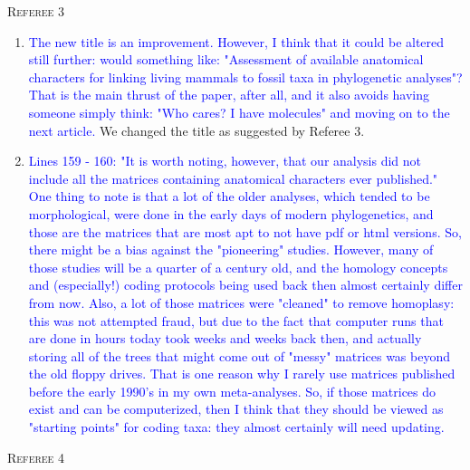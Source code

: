 \documentclass[12pt,letterpaper]{article}
\renewcommand{\section}[1]{%
\bigskip
\begin{center}
\begin{Large}
\normalfont\scshape #1
\medskip
\end{Large}
\end{center}}
\begin{document}
\section{Referee 3}

\begin{enumerate}
\item{\textcolor{blue}{The new title is an improvement.  However, I think that it could be altered still further: would something like: "Assessment of available anatomical characters for linking living mammals to fossil taxa in phylogenetic analyses"?  That is the main thrust of the paper, after all, and it also avoids having someone simply think: "Who cares? I have molecules" and moving on to the next article.}}
We changed the title as suggested by Referee 3.

\item{\textcolor{blue}{Lines 159 - 160: "It is worth noting, however, that our analysis did not include all the matrices containing anatomical characters ever published."
One thing to note is that a lot of the older analyses, which tended to be morphological, were done in the early days of modern phylogenetics, and those are the matrices that are most apt to not have pdf or html versions.  So, there might be a bias against the "pioneering" studies.  However, many of those studies will be a quarter of a century old, and the homology concepts and (especially!) coding protocols being used back then almost certainly differ from now.  Also, a lot of those matrices were "cleaned" to remove homoplasy: this was not attempted fraud, but due to the fact that computer runs that are done in hours today took weeks and weeks back then, and actually storing all of the trees that might come out of "messy" matrices was beyond the old floppy drives.  That is one reason why I rarely use matrices published before the early 1990's in my own meta-analyses.  So, if those matrices do exist and can be computerized, then I think that they should be viewed as "starting points" for coding taxa: they almost certainly will need updating.}}



\end{enumerate}

\section{Referee 4}
\end{document}
